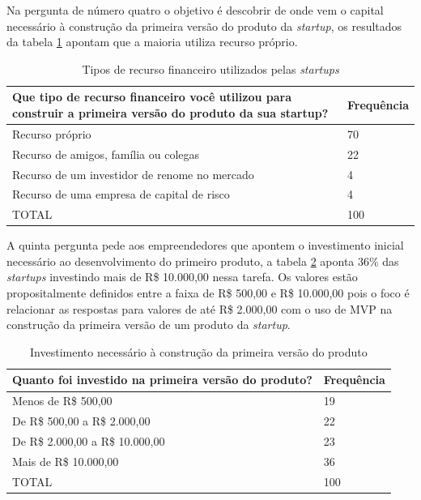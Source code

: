 \pagebreak

Na pergunta de n\'umero quatro o objetivo \'e descobrir de onde vem o capital necess\'ario \`a constru\c{c}\~ao da primeira vers\~ao do produto da \emph{startup}, os resultados da tabela \ref{tab:pergunta4} apontam que a maioria utiliza recurso pr\'oprio.

\begin{table}[hb]
\centering
\caption{Tipos de recurso financeiro utilizados pelas \emph{startups}}
\label{tab:pergunta4}
\begin{tabular}{|p{10cm}|p{2cm}|}
\hline{\bf Que tipo de recurso financeiro voc\^e utilizou para construir a primeira vers\~ao do produto da sua startup?} & {\bf Frequ\^encia}\\
\hline Recurso pr\'oprio & 70\\
\hline Recurso de amigos, fam\'ilia ou colegas & 22\\
\hline Recurso de um investidor de renome no mercado & 4\\
\hline Recurso de uma empresa de capital de risco & 4\\
\hline TOTAL & 100\\
\hline
\end{tabular}
\end{table}

A quinta pergunta pede aos empreendedores que apontem o investimento inicial necess\'ario ao desenvolvimento do primeiro produto, a tabela \ref{tab:pergunta5} aponta 36\% das \emph{startups} investindo mais de R\$ 10.000,00 nessa tarefa. Os valores est\~ao propositalmente definidos entre a faixa de R\$ 500,00 e R\$ 10.000,00 pois o foco \'e relacionar as respostas para valores de at\'e R\$ 2.000,00 com o uso de MVP na constru\c{c}\~ao da primeira vers\~ao de um produto da \emph{startup}.

\begin{table}[hb]
\centering
\caption{Investimento necess\'ario \`a constru\c{c}\~ao da primeira vers\~ao do produto}
\label{tab:pergunta5}
\begin{tabular}{|p{10cm}|p{2cm}|}
\hline{\bf Quanto foi investido na primeira vers\~ao do produto?} & {\bf Frequ\^encia}\\
\hline Menos de R\$ 500,00 & 19\\
\hline De R\$ 500,00 a R\$ 2.000,00 & 22\\
\hline De R\$ 2.000,00 a R\$ 10.000,00 & 23\\
\hline Mais de R\$ 10.000,00 & 36\\
\hline TOTAL & 100\\
\hline
\end{tabular}
\end{table}

